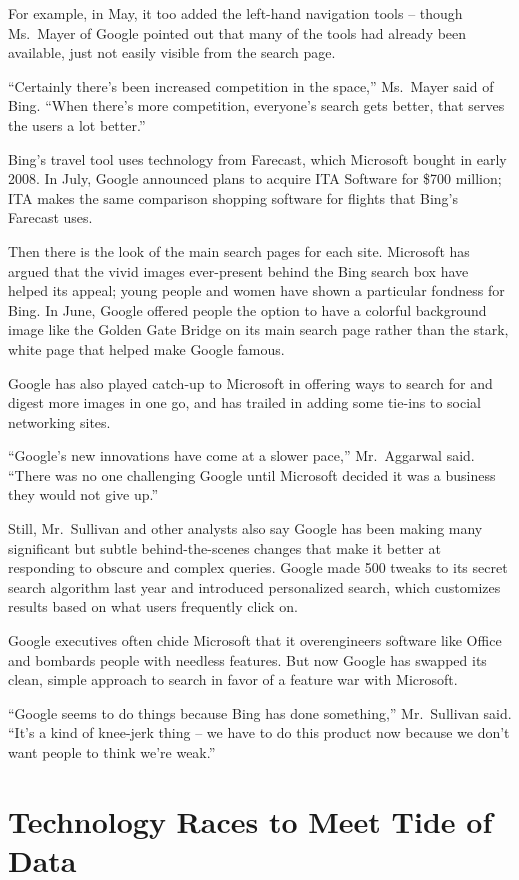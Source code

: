 ﻿\documentclass[12pt]{article}
\begin{document}
For example, in May, it too added the left-hand navigation tools -- though Ms.~Mayer of Google
pointed out that many of the tools had already been available, just not easily visible from the
search page.

``Certainly there's been increased competition in the space,'' Ms.~Mayer said of Bing. ``When
there's more competition, everyone's search gets better, that serves the users a lot better.''

Bing's travel tool uses technology from Farecast, which Microsoft bought in early 2008. In July,
Google announced plans to acquire ITA Software for \$700 million; ITA makes the same comparison
shopping software for flights that Bing's Farecast uses.

Then there is the look of the main search pages for each site. Microsoft has argued that the vivid
images ever-present behind the Bing search box have helped its appeal; young people and women have
shown a particular fondness for Bing. In June, Google offered people the option to have a colorful
background image like the Golden Gate Bridge on its main search page rather than the stark, white
page that helped make Google famous.

Google has also played catch-up to Microsoft in offering ways to search for and digest more images
in one go, and has trailed in adding some tie-ins to social networking sites.

``Google's new innovations have come at a slower pace,'' Mr.~Aggarwal said. ``There was no one
challenging Google until Microsoft decided it was a business they would not give up.''

Still, Mr.~Sullivan and other analysts also say Google has been making many significant but subtle
behind-the-scenes changes that make it better at responding to obscure and complex queries. Google
made 500 tweaks to its secret search algorithm last year and introduced personalized search, which
customizes results based on what users frequently click on.

Google executives often chide Microsoft that it overengineers software like Office and bombards
people with needless features. But now Google has swapped its clean, simple approach to search in
favor of a feature war with Microsoft.

``Google seems to do things because Bing has done something,'' Mr.~Sullivan said. ``It's a kind of
knee-jerk thing -- we have to do this product now because we don't want people to think we're
weak.''

\section{Technology Races to Meet Tide of Data}
\end{document}
